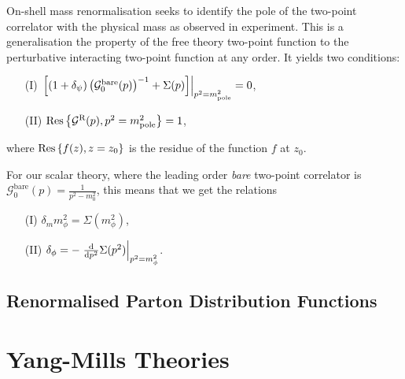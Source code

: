 \documentclass[../main.tex]{subfiles}
\begin{document}
On-shell mass renormalisation seeks to identify the pole of the two-point correlator with the physical mass as observed in experiment.
This is a generalisation the property of the free theory two-point function to the perturbative interacting two-point function at any order.
It yields two conditions:
\begin{center}
  \begin{itemize}
    \item [(I)] \(\evalat{\bclosed{(1+\delta_\psi)\pclosed{\mathcal{G}^\text{bare}_0(p)}^{-1}
              + \Sigma(p)}}{p^2 = m_\text{pole}^2} = 0\),
    \item [(II)] \(\operatorname{Res}\cclosed{\mathcal{G}^\text{R}(p), p^2
            = m_\text{pole}^2} = 1\),
  \end{itemize}
\end{center}
where \(\operatorname{Res}\cclosed{f(z), z = z_0}\) is the residue of the
function \(f\) at \(z_0\).
\medskip

For our scalar theory, where the leading order \emph{bare} two-point correlator is
\(\mathcal{G}_0^\text{bare}(p) =\frac{1}{p^2 - m_0^2}\), this means that we get the
relations
\begin{center}
  \begin{itemize}
    \item [(I)] \(\delta_m m_\phi^2 = \Sigma(m_\phi^2)\),
    \item [(II)] \(\delta_\phi = -\evalat{\d[p^2]{}\Sigma(p^2)}{p^2 =
            m_\phi^2}\).
  \end{itemize}
\end{center}
\provethis{}







\subsection{Renormalised Parton Distribution Functions}




\section{Yang-Mills Theories}
\label{qft:sec:yang-mills}
\end{document}

